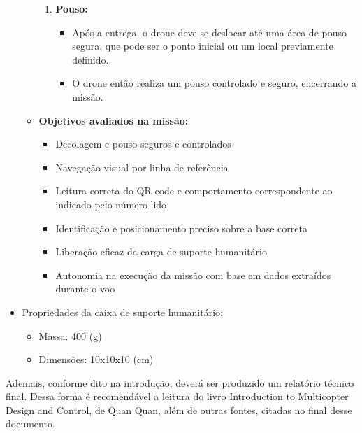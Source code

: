 \begin{itemize}
\begin{itemize}
\begin{enumerate}
            \item \textbf{Pouso:}
            \begin{itemize}
                \item Após a entrega, o drone deve se deslocar até uma área de pouso segura, que pode ser o ponto inicial ou um local previamente definido.
                \item O drone então realiza um pouso controlado e seguro, encerrando a missão.
            \end{itemize}
        \end{enumerate}
        
        \item \textbf{Objetivos avaliados na missão:} 
        \begin{itemize}
            \item Decolagem e pouso seguros e controlados
            \item Navegação visual por linha de referência
            \item Leitura correta do QR code {\color{red}e comportamento correspondente ao indicado pelo número lido}
            \item {\color{red}Identificação e} posicionamento preciso sobre a base correta
            \item Liberação eficaz da carga de suporte humanitário
            \item Autonomia na execução da missão com base em dados extraídos durante o voo
        \end{itemize}
    \end{itemize}

    \item {\color{red} Propriedades da caixa de suporte humanitário:
    
    \begin{itemize}
        \item Massa: 400 (g)
        \item Dimensões: 10x10x10 (cm)
    \end{itemize}}
\end{itemize}

Ademais, conforme dito na introdução, deverá ser produzido um relatório técnico final. Dessa forma é recomendável a leitura do livro Introduction to Multicopter Design and Control, de Quan Quan, além de outras fontes, citadas no final desse documento.

